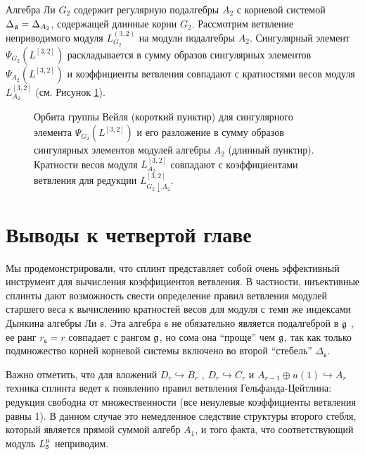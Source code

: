 \vspace{10mm}
\begin{example}
  Алгебра Ли  $G_{2}$ содержит регулярную подалгебры  $A_{2}$ с корневой системой $\Delta_{\mathfrak{a}}=\Delta_{A_{2}}$, содержащей длинные корни $G_{2}$. Рассмотрим ветвление неприводимого модуля $L_{G_{2}}^{(3,2)}$ на модули подалгебры $A_{2}$. Сингулярный элемент $\Psi_{G_{2}}(L^{[3,2]})$ раскладывается в сумму образов сингулярных элементов  $\Psi_{A_{2}}(L^{[3,2]})$ и коэффициенты ветвления совпадают с кратностями весов модуля $L^{[3,2]}_{A_{2}}$ (см. Рисунок \ref{fig:g2_splint}).


  \begin{figure}[h!bt]
  \noindent\centering{
   \texttt{[image: g2]}
  }

  \caption{Орбита группы Вейля  (короткий пунктир) для сингулярного элемента  $\Psi_{G_{2}}(L^{[3,2]})$ и его разложение в сумму образов сингулярных элементов модулей алгебры $A_{2}$ (длинный пунктир). Кратности весов модуля $L^{[3,2]}_{A_{2}}$ совпадают с коэффициентами ветвления для редукции $L^{[3,2]}_{G_{2}\downarrow A_{2}}$.}


 \label{fig:g2_splint}
\end{figure}

\end{example}

\section{Выводы к четвертой главе}

\label{sec:4-conclusions}
Мы продемонстрировали, что сплинт представляет собой очень эффективный инструмент для вычисления коэффициентов ветвления.  В частности, инъективные сплинты дают возможность свести определение правил ветвления модулей старшего веса к вычислению кратностей весов для модуля с теми же индексами Дынкина алгебры Ли $\mathfrak{s}$. Эта алгебра $\mathfrak{s}$ не обязательно является подалгеброй в  $\mathfrak{g}$ , ее ранг $r_{\mathfrak{s}}=r$ совпадает с рангом $\mathfrak{g}$, но сома она ``проще'' чем  $\mathfrak{g}$, так как только подмножество корней корневой системы включено во второй ``стебель''  $\Delta_{\mathfrak{s}}$.

Важно отметить, что для вложений  $D_{r}\hookrightarrow B_{r}$ , $D_{r}\hookrightarrow C_{r}$ и $A_{r-1}\oplus u\left( 1\right) \hookrightarrow A_{r}$ техника сплинта ведет к появлению правил ветвления Гельфанда-Цейтлина: редукция свободна от множественности (все ненулевые коэффициенты ветвления равны 1). В данном случае это немедленное следствие структуры второго стебля, который является прямой суммой алгебр $A_{1}$, и того факта, что соответствующий модуль $L_{\mathfrak{s}}^{\mu }$ неприводим.


